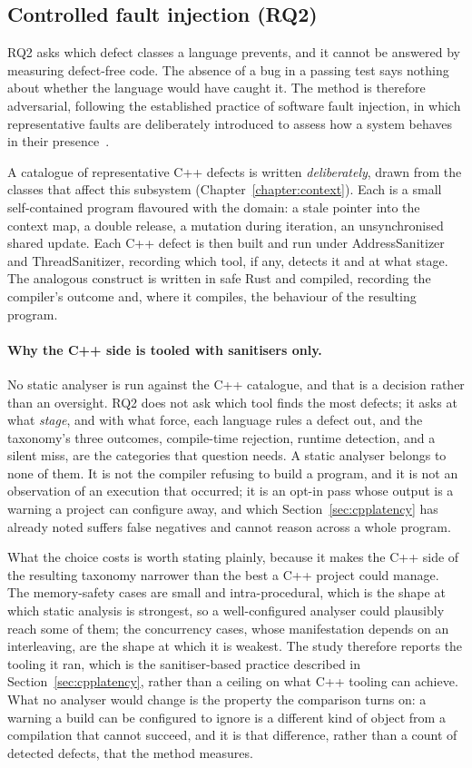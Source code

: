 \documentclass[english,twoside,openright,a4paper,censored,csm,software-track-2020]{HYthesisML}
\begin{document}
\subsection{Controlled fault injection (RQ2)}\label{sec:methodfaults}
RQ2 asks which defect classes a language prevents, and it cannot be answered by measuring
defect-free code. The absence of a bug in a passing test says nothing about whether the
language would have caught it. The method is therefore adversarial, following the established
practice of software fault injection, in which representative faults are deliberately introduced
to assess how a system behaves in their presence~\cite{natella2016fault}.

A catalogue of representative C++ defects is written \emph{deliberately}, drawn from the classes
that affect this subsystem (Chapter~\ref{chapter:context}). Each is a small self-contained
program flavoured with the domain: a stale pointer into the context map, a double release, a
mutation during iteration, an unsynchronised shared update. Each C++ defect is then built and
run under AddressSanitizer and ThreadSanitizer, recording which tool, if any, detects it and at
what stage. The analogous construct is written in safe Rust and compiled, recording the
compiler's outcome and, where it compiles, the behaviour of the resulting program.

\paragraph{Why the C++ side is tooled with sanitisers only.}
No static analyser is run against the C++ catalogue, and that is a decision rather than an
oversight. RQ2 does not ask which tool finds the most defects; it asks at what \emph{stage}, and
with what force, each language rules a defect out, and the taxonomy's three outcomes,
compile-time rejection, runtime detection, and a silent miss, are the categories that question
needs. A static analyser belongs to none of them. It is not the compiler refusing to build a
program, and it is not an observation of an execution that occurred; it is an opt-in pass whose
output is a warning a project can configure away, and which Section~\ref{sec:cpplatency} has
already noted suffers false negatives and cannot reason across a whole program.

What the choice costs is worth stating plainly, because it makes the C++ side of the resulting
taxonomy narrower than the best a C++ project could manage. The memory-safety cases are small
and intra-procedural, which is the shape at which static analysis is strongest, so a
well-configured analyser could plausibly reach some of them; the concurrency cases, whose
manifestation depends on an interleaving, are the shape at which it is weakest. The study
therefore reports the tooling it ran, which is the sanitiser-based practice described in
Section~\ref{sec:cpplatency}, rather than a ceiling on what C++ tooling can achieve. What no
analyser would change is the property the comparison turns on: a warning a build can be
configured to ignore is a different kind of object from a compilation that cannot succeed, and
it is that difference, rather than a count of detected defects, that the method measures.
\end{document}
